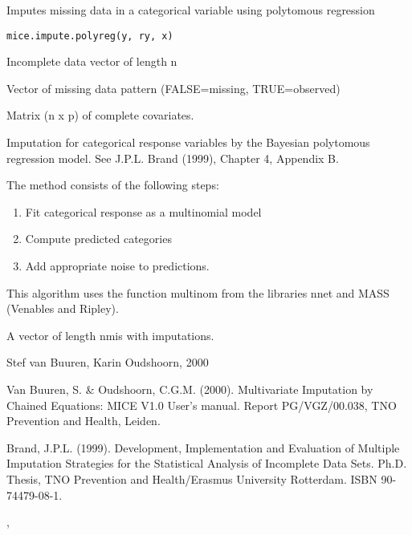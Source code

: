 \documentclass{article}
\begin{document}
\begin{Description}\relax
Imputes missing data in a categorical variable using polytomous regression
\end{Description}
\begin{Usage}
\begin{verbatim}
mice.impute.polyreg(y, ry, x)
\end{verbatim}
\end{Usage}
\begin{Arguments}
\begin{ldescription}
\item[\code{y}] Incomplete data vector of length n
\item[\code{ry}] Vector of missing data pattern (FALSE=missing, TRUE=observed)
\item[\code{x}] Matrix (n x p) of complete covariates.
\end{ldescription}
\end{Arguments}
\begin{Details}\relax
Imputation for categorical response variables by the Bayesian 
polytomous regression model. See J.P.L. Brand (1999), Chapter 4,
Appendix B.

The method consists of the following steps:
\begin{enumerate}
\item Fit categorical response as a multinomial model 
\item Compute predicted categories
\item Add appropriate noise to predictions.
\end{enumerate}
This algorithm uses the function multinom from the libraries nnet and MASS
(Venables and Ripley).
\end{Details}
\begin{Value}
A vector of length nmis with imputations.
\end{Value}
\begin{Author}\relax
Stef van Buuren, Karin Oudshoorn, 2000
\end{Author}
\begin{References}\relax
Van Buuren, S. \& Oudshoorn, C.G.M. (2000). Multivariate Imputation by Chained Equations: 
MICE V1.0 User's manual. Report PG/VGZ/00.038, TNO Prevention and Health, Leiden.

Brand, J.P.L. (1999). Development, Implementation and Evaluation of Multiple Imputation Strategies for the Statistical Analysis of Incomplete Data Sets. Ph.D. Thesis, TNO Prevention and Health/Erasmus University Rotterdam. ISBN 90-74479-08-1.
\end{References}
\begin{SeeAlso}\relax
{}, 
\end{SeeAlso}
\end{document}
